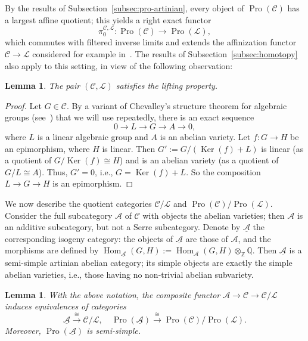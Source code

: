 \documentclass[11pt]{article}
\newtheorem{lemm}[theo]{Lemma}
\theoremstyle{definition}
\numberwithin{equation}{section}
\newcommand\bQ{{\mathbb Q}}
\newcommand\bZ{{\mathbb Z}}
\newcommand\cA{{\mathcal A}}
\newcommand\cC{{\mathcal C}}
\newcommand\cL{{\mathcal L}}
\newcommand\ucA{\underline{\mathcal A}}
\DeclareMathOperator{\Hom}{Hom}
\DeclareMathOperator{\Ker}{Ker}
\DeclareMathOperator{\Pro}{Pro}
\theoremstyle{remark}
\begin{document}
By the results of Subsection~\ref{subsec:pro-artinian}, every object of $\Pro(\cC)$ has a largest affine quotient; this yields a right exact functor
\[
\pi_0^{\cC,\cL} : \Pro(\cC) \longrightarrow \Pro(\cL),
\]
which commutes with filtered inverse limits and extends the affinization functor $\cC \to \cL$ considered for example in~\cite[III.3.8]{DG}. The results of Subsection~\ref{subsec:homotopy} also apply to this setting, in view of the following observation:

\begin{lemm}\label{lem:CL}
The pair $(\cC,\cL)$ satisfies the lifting property.
\end{lemm}

\begin{proof}
Let $G \in \cC$. By a variant of Chevalley's structure theorem for algebraic groups (see~\cite[Thm.~2.3]{Br17a}) that we will use repeatedly, there is an exact sequence
\begin{equation}\label{eqn:LGA}
0 \longrightarrow L \longrightarrow G \longrightarrow A
\longrightarrow 0,
\end{equation}
where $L$ is a linear algebraic group and $A$ is an abelian variety. Let $f: G \to H$ be an epimorphism, where $H$ is linear. Then $G' := G/(\Ker(f) + L)$ is linear (as a quotient of $G/\Ker(f) \cong H$) and is an abelian variety (as a quotient of $G/L \cong A$). Thus, $G' = 0$, i.e., $G = \Ker(f) + L$. So the composition $L \to G \to H$ is an epimorphism.
\end{proof}

We now describe the quotient categories $\cC/\cL$ and $\Pro(\cC)/\Pro(\cL)$. Consider the full subcategory $\cA$ of $\cC$ with objects the abelian varieties; then $\cA$ is an additive subcategory, but not a Serre subcategory. Denote by $\ucA$ the corresponding isogeny category: the objects of $\ucA$ are those of $\cA$, and the morphisms are defined by $\Hom_{\ucA}(G,H) := \Hom_{\cA}(G,H) \otimes_{\bZ} \bQ$. Then $\ucA$ is a semi-simple artinian abelian category; its simple objects are exactly the simple abelian varieties, i.e., those having no non-trivial abelian subvariety.


\begin{lemm}\label{lem:isogeny}
With the above notation, the composite functor $\cA \to \cC \to \cC/\cL$ induces equivalences of categories
\[
\ucA \stackrel{\cong}{\longrightarrow} \cC/\cL,
\quad
\Pro(\ucA) \stackrel{\cong}{\longrightarrow}
\Pro(\cC)/\Pro(\cL).
\]
Moreover, $\Pro(\ucA)$ is semi-simple.
\end{lemm}
\end{document}
